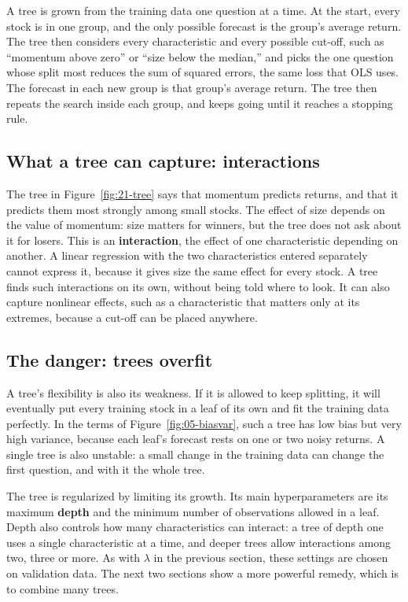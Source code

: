 A tree is grown from the training data one question at a time. At the start, every stock is in one group, and the only possible forecast is the group's average return. The tree then considers every characteristic and every possible cut-off, such as ``momentum above zero'' or ``size below the median,'' and picks the one question whose split most reduces the sum of squared errors, the same loss that OLS uses. The forecast in each new group is that group's average return. The tree then repeats the search inside each group, and keeps going until it reaches a stopping rule.

\subsection{What a tree can capture: interactions}

The tree in Figure~\ref{fig:21-tree} says that momentum predicts returns, and that it predicts them most strongly among small stocks. The effect of size depends on the value of momentum: size matters for winners, but the tree does not ask about it for losers. This is an \textbf{interaction}, the effect of one characteristic depending on another. A linear regression with the two characteristics entered separately cannot express it, because it gives size the same effect for every stock. A tree finds such interactions on its own, without being told where to look. It can also capture nonlinear effects, such as a characteristic that matters only at its extremes, because a cut-off can be placed anywhere.

\subsection{The danger: trees overfit}

A tree's flexibility is also its weakness. If it is allowed to keep splitting, it will eventually put every training stock in a leaf of its own and fit the training data perfectly. In the terms of Figure~\ref{fig:05-biasvar}, such a tree has low bias but very high variance, because each leaf's forecast rests on one or two noisy returns. A single tree is also unstable: a small change in the training data can change the first question, and with it the whole tree.

The tree is regularized by limiting its growth. Its main hyperparameters are its maximum \textbf{depth} and the minimum number of observations allowed in a leaf. Depth also controls how many characteristics can interact: a tree of depth one uses a single characteristic at a time, and deeper trees allow interactions among two, three or more. As with $\lambda$ in the previous section, these settings are chosen on validation data. The next two sections show a more powerful remedy, which is to combine many trees.

